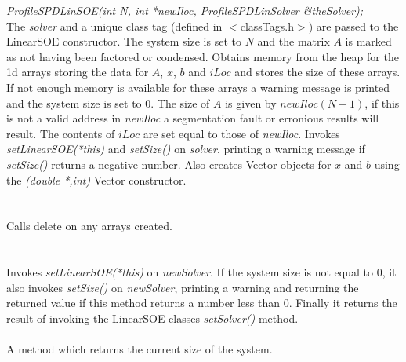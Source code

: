 {\em ProfileSPDLinSOE(int N, int *newIloc,
		  ProfileSPDLinSolver \&theSolver); }\\
The {\em solver} and a unique class tag (defined in $<$classTags.h$>$)
are passed to the LinearSOE constructor. The system size is set
to $N$ and the matrix $A$ is marked as not having been
factored or condensed. Obtains memory from the heap for the 1d arrays storing the
data for $A$, $x$, $b$ and $iLoc$ and stores the size of these arrays. If not
enough memory is available for these arrays a warning message is
printed and the system size is set to $0$. The size of $A$ is given
by $newIloc(N-1)$, if this is not a valid address in {\em newIloc} a
segmentation fault or erronious results will result. The contents of
$iLoc$ are set equal to those of {\em newIloc}. Invokes {\em
setLinearSOE(*this)} and {\em setSize()} on {\em solver},
printing a warning message if {\em setSize()} returns a negative
number. Also creates Vector objects for $x$ and $b$ using the {\em
(double *,int)} Vector constructor. \\

 \\
\\ 
Calls delete on any arrays created. \\

  \\
\\
Invokes {\em setLinearSOE(*this)} on {\em newSolver}.
If the system size is not equal to $0$, it also invokes {\em setSize()}
on {\em newSolver}, printing a warning and returning the returned value if this
method returns a number less than $0$. Finally it returns the result
of invoking the LinearSOE classes {\em setSolver()} method. \\

 \\
A method which returns the current size of the system. \\

